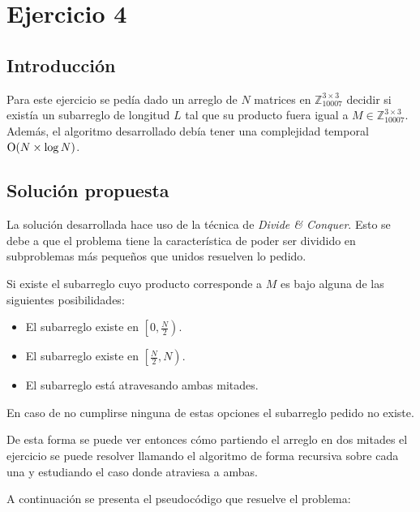 \section{Ejercicio 4}

\subsection{Introducción}

Para este ejercicio se pedía dado un arreglo de $N$ matrices en
$\mathbb{Z}_{10007}^{3 \times 3}$ decidir si existía un subarreglo de longitud
$L$ tal que su producto fuera igual a $M \in \mathbb{Z}_{10007}^{3 \times 3}$.
Además, el algoritmo desarrollado debía tener una complejidad temporal $\operatorname{O}(N
\times \log N)$.

\subsection{Solución propuesta}

La solución desarrollada hace uso de la técnica de \emph{Divide \& Conquer}.
Esto se debe a que el problema tiene la característica de poder ser dividido en
subproblemas más pequeños que unidos resuelven lo pedido.

Si existe el subarreglo cuyo producto corresponde a $M$ es bajo alguna de
las siguientes posibilidades:

\begin{itemize}
	\item El subarreglo existe en $\left[ 0,\frac{N}{2} \right)$.
	\item El subarreglo existe en $\left[\frac{N}{2}, N \right)$.
	\item El subarreglo está atravesando ambas mitades.
\end{itemize}

En caso de no cumplirse ninguna de estas opciones el subarreglo pedido no
existe.

De esta forma se puede ver entonces cómo partiendo el arreglo en dos
mitades el ejercicio se puede resolver llamando el algoritmo de forma recursiva
sobre cada una y estudiando el caso donde atraviesa a ambas.

A continuación se presenta el pseudocódigo que resuelve el problema:

